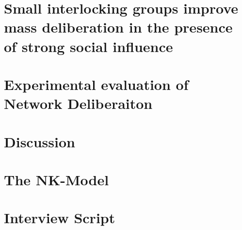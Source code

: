 \documentclass{report}
\newcommand{\+}{\phantom{-}}
\begin{document}
\chapter{Small interlocking groups improve mass deliberation in the presence
of strong social influence}
\label{chap:abm}


\chapter{Experimental evaluation of Network Deliberaiton}
\label{chap:experiment}


\chapter{Discussion}
\label{chap:discussion}


%


\begin{appendices}

\chapter{The NK-Model}
\label{apx:nk}


\chapter{Interview Script}
\label{apx:interview}


\end{appendices}

\nocite{*}


\end{document}
